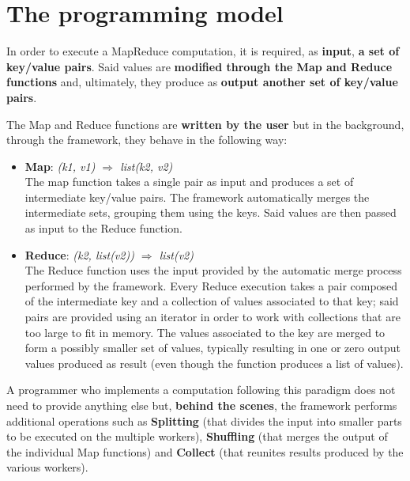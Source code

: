 \section{The programming model}
In order to execute a MapReduce computation, it is required, as \textbf{input}, \textbf{a set of key/value pairs}. Said values are \textbf{modified through the Map and Reduce functions} and, ultimately, they produce as \textbf{output another set of key/value pairs}. 

The Map and Reduce functions are \textbf{written by the user} but in the background, through the framework, they behave in the following way:
\begin{itemize}
    \item \textbf{Map}: \textit{(k1, v1) $\Longrightarrow$ list(k2, v2)}\\
    The map function takes a single pair as input and produces a set of intermediate key/value pairs. The framework automatically merges the intermediate sets, grouping them using the keys. Said values are then passed as input to the Reduce function.
    \item \textbf{Reduce}: \textit{(k2, list(v2)) $\Longrightarrow$ list(v2)}\\
    The Reduce function uses the input provided by the automatic merge process performed by the framework. Every Reduce execution takes a pair composed of the intermediate key and a collection of values associated to that key; said pairs are provided using an iterator in order to work with collections that are too large to fit in memory. The values associated to the key are merged to form a possibly smaller set of values, typically resulting in one or zero output values produced as result (even though the function produces a list of values).
\end{itemize}
A programmer who implements a computation following this paradigm does not need to provide anything else but, \textbf{behind the scenes}, the framework performs additional operations such as \textbf{Splitting} (that divides the input into smaller parts to be executed on the multiple workers), \textbf{Shuffling} (that merges the output of the individual Map functions) and \textbf{Collect} (that reunites results produced by the various workers).
